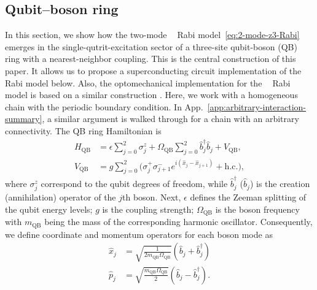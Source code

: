 \documentclass[reprint, aps, prx, amsmath, amssymb, longbibliography, superscriptaddress]{revtex4-2}
\DeclareMathOperator{\Zthree}{\mathbb{Z}_3}
\begin{document}
\subsection{Qubit--boson ring}
\label{sec:physical-implementation}

In this section, we show how the two-mode $\Zthree$ Rabi model~\eqref{eq:2-mode-z3-Rabi} emerges
in the single-qutrit-excitation sector of a three-site qubit-boson (QB) ring with a
nearest-neighbor coupling. This is the central construction of this paper. It allows us to propose a superconducting circuit implementation of the $\Zthree$ Rabi model below. Also, the optomechanical implementation for the $\Zthree$ Rabi model is based on a similar construction \cite{sedov_chiral_2020}.  Here, we work with a homogeneous chain with the periodic boundary condition. In App.~\ref{app:arbitrary-interaction-summary}, a similar argument is walked through for a chain with an arbitrary connectivity. The QB ring Hamiltonian is
\begin{equation}
\label{physical-hamiltonian}
  \begin{aligned}
    H_{\text{QB}} &= \epsilon \sum_{j=0}^{2} \sigma_j^z
      + \Omega_{\text{QB}} \sum_{j=0}^{2} \hat b_j^{\dagger} \hat b_j
      + V_{\text{QB}},
      \\
    V_{\text{QB}} &= g \sum_{j=0}^{2}
      \bigl( \sigma_j^{+} \sigma_{j+1}^{-}
      e^{ i ( \hat x_j - \hat x_{j+1} ) } + \text{h.c.} \bigr),
  \end{aligned}
\end{equation}
where $\sigma_j^z$ correspond to the qubit degrees of freedom, while $\hat b_j^{\dagger}$ ($\hat b_j$) is the creation (annihilation) operator of the $j$th boson. Next, $\epsilon$ defines the Zeeman splitting of the qubit energy levels; $g$ is the coupling strength; $\Omega_{\text{QB}}$ is the boson frequency with $m_{\text{QB}}$  being the mass of the corresponding harmonic oscillator. Consequently, we define coordinate and momentum operators for each boson mode as
\begin{align}
    \hat x_j &= \sqrt{\frac{1}{2 m_{\text{QB}} \Omega_{\text{QB}}}}\left(\hat b_j + \hat b_j^{\dagger}\right) \\
    \hat p_j &= \sqrt{\frac{m_{\text{QB}} \Omega_{\text{QB}}}{2 }}\left(\hat b_j - \hat b_j^{\dagger}\right).
\end{align}

\end{document}

